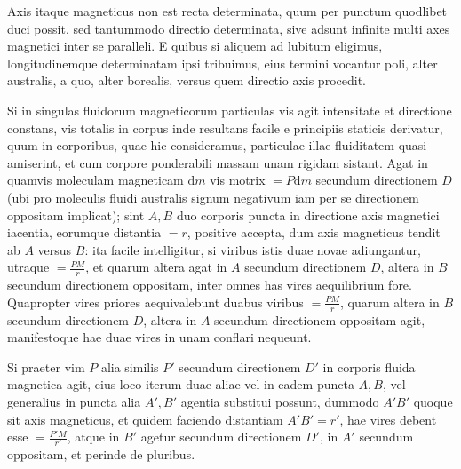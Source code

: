Axis itaque magneticus non est recta determinata, quum per punctum quodlibet duci possit, sed tantummodo directio determinata, sive adsunt infinite multi axes magnetici inter se paralleli. E quibus si aliquem ad lubitum eligimus, longitudinemque determinatam ipsi tribuimus, eius termini vocantur poli, alter australis, a quo, alter borealis, versus quem directio axis procedit.

Si in singulas fluidorum magneticorum particulas vis agit intensitate et directione constans, vis totalis in corpus inde resultans facile e principiis staticis derivatur, quum in corporibus, quae hic consideramus, particulae illae fluiditatem quasi amiserint, et cum corpore ponderabili massam unam rigidam sistant. Agat in quamvis moleculam magneticam $\mathrm{d}m$ vis motrix $=P\mathrm{d}m$ secundum directionem $D$ (ubi pro moleculis fluidi australis signum negativum iam per se directionem oppositam implicat); sint $A,B$ duo corporis puncta in directione axis magnetici iacentia, eorumque distantia $=r$, positive accepta, dum axis magneticus tendit ab $A$ versus $B$: ita facile intelligitur, si viribus istis duae novae adiungantur, utraque $=\frac{PM}{r}$, et quarum altera agat in $A$ secundum directionem $D$, altera in $B$ secundum directionem oppositam, inter omnes has vires aequilibrium fore. Quapropter vires priores aequivalebunt duabus viribus $=\frac{PM}{r}$, quarum altera in $B$ secundum directionem $D$, altera in $A$ secundum directionem oppositam agit, manifestoque hae duae vires in unam conflari nequeunt.

Si praeter vim $P$ alia similis $P'$ secundum directionem $D'$ in corporis fluida magnetica agit, eius loco iterum duae aliae vel in eadem puncta $A,B$, vel generalius in puncta alia $A',B'$ agentia substitui possunt, dummodo $A'B'$ quoque sit axis magneticus, et quidem faciendo distantiam $A'B'=r'$, hae vires debent esse $=\frac{P'M}{r'}$, atque in $B'$ agetur secundum directionem $D'$, in $A'$ secundum oppositam, et perinde de pluribus.

